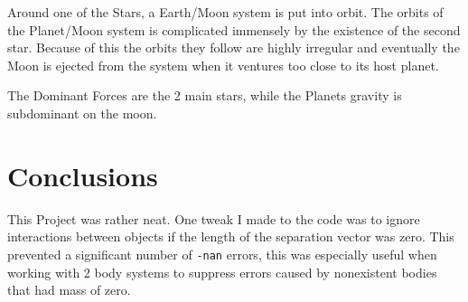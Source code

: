 \documentclass{article}
\begin{document}
Around one of the Stars, a Earth/Moon system is put into orbit. The orbits of the Planet/Moon system is complicated immensely by the existence of the second star. Because of this the orbits they follow are highly irregular and eventually the Moon is ejected from the system when it ventures too close to its host planet.

The Dominant Forces are the 2 main stars, while the Planets gravity is subdominant on the moon.


\section{Conclusions}

This Project was rather neat. One tweak I made to the code was to ignore interactions between objects if the length of the separation vector was zero. This prevented a significant number of \texttt{-nan} errors, this was especially useful when working with 2 body systems to suppress errors caused by nonexistent bodies that had mass of zero. 
\end{document}
